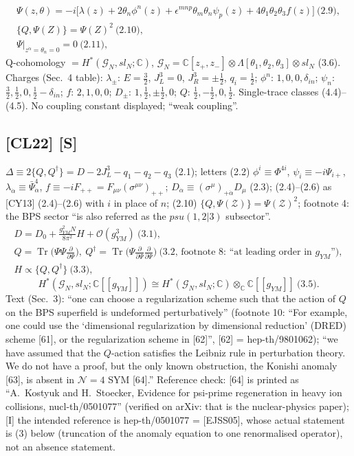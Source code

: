 \documentclass[10pt]{article}
\begin{document}
\begin{gather*}
\Psi(z,\theta)=-i\big[\lambda(z)+2\theta_n\phi^n(z)+\epsilon^{mnp}\theta_m\theta_n\psi_p(z)+4\theta_1\theta_2\theta_3f(z)\big]\ \text{(2.9)},\\ \{Q,\Psi(Z)\}=\Psi(Z)^2\ \text{(2.10)},\\ \Psi|_{z^{\dot\alpha}=\theta_n=0}=0\ \text{(2.11)},
\end{gather*}
Q-cohomology $=H^*(\mathcal G_N,sl_N;\mathbb C)$, $\mathcal G_N=\mathbb C[z_+,z_-]\otimes\Lambda[\theta_1,\theta_2,\theta_3]\otimes sl_N$ (3.6). Charges (Sec.\ 4 table): $\lambda_\pm$: $E=\frac32$, $J_L^3=0$, $J_R^3=\pm\frac12$, $q_i=\frac12$; $\phi^n$: $1,0,0,\delta_{in}$; $\psi_n$: $\frac32,\frac12,0,\frac12-\delta_{in}$; $f$: $2,1,0,0$; $D_\pm$: $1,\frac12,\pm\frac12,0$; $Q$: $\frac12,-\frac12,0,\frac12$. Single-trace classes (4.4)--(4.5). No coupling constant displayed; ``weak coupling''.

\subsection{[CL22] [S]}
$\Delta\equiv2\{Q,Q^\dagger\}=D-2J_L^3-q_1-q_2-q_3$ (2.1); letters (2.2) $\phi^i\equiv\Phi^{4i}$, $\psi_i\equiv-i\Psi_{i+}$, $\lambda_{\dot\alpha}\equiv\bar\Psi^4_{\dot\alpha}$, $f\equiv-iF_{++}=F_{\mu\nu}(\sigma^{\mu\nu})_{++}$; $D_{\dot\alpha}\equiv(\sigma^\mu)_{+\dot\alpha}D_\mu$ (2.3); (2.4)--(2.6) as [CY13] (2.4)--(2.6) with $i$ in place of $n$; (2.10) $\{Q,\Psi(\mathcal Z)\}=\Psi(\mathcal Z)^2$; footnote 4: the BPS sector ``is also referred as the $psu(1,2|3)$ subsector''.
\begin{gather*}
D=D_0+\frac{g_{YM}^2N}{8\pi^2}H+\mathcal O(g_{YM}^3)\ \text{(3.1)},\\ Q=\operatorname{Tr}\Big(\Psi\Psi\frac{\partial}{\partial\Psi}\Big),\ Q^\dagger=\operatorname{Tr}\Big(\Psi\frac{\partial}{\partial\Psi}\frac{\partial}{\partial\Psi}\Big)\ \text{(3.2, footnote 8: ``at leading order in $g_{YM}$'')},\\ H\propto\{Q,Q^\dagger\}\ \text{(3.3)},
\end{gather*}
\begin{equation*}
H^*(\mathcal G_N,sl_N;\mathbb C[[g_{YM}]])\cong H^*(\mathcal G_N,sl_N;\mathbb C)\otimes_{\mathbb C}\mathbb C[[g_{YM}]]\ \text{(3.5)}.
\end{equation*}
Text (Sec.\ 3): ``one can choose a regularization scheme such that the action of $Q$ on the BPS superfield is undeformed perturbatively'' (footnote 10: ``For example, one could use the `dimensional regularization by dimensional reduction' (DRED) scheme [61], or the regularization scheme in [62]'', [62] = hep-th/9801062); ``we have assumed that the $Q$-action satisfies the Leibniz rule in perturbation theory. We do not have a proof, but the only known obstruction, the Konishi anomaly [63], is absent in $\mathcal N=4$ SYM [64].'' Reference check: [64] is printed as ``A.~Kostyuk and H.~Stoecker, Evidence for psi-prime regeneration in heavy ion collisions, nucl-th/0501077'' (verified on arXiv: that is the nuclear-physics paper); [I] the intended reference is hep-th/0501077 = [EJSS05], whose actual statement is (3) below (truncation of the anomaly equation to one renormalised operator), not an absence statement.
\end{document}
